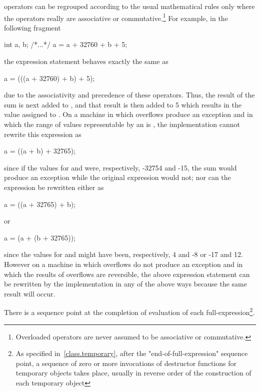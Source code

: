 \pnum
{}%
%
\enternote operators can be regrouped according to the usual
mathematical rules only where the operators really are associative or
commutative.\footnote{Overloaded operators are never assumed to be associative or
commutative. }
For example, in the following fragment
\begin{codeblock}
int a, b;
/*...*/
a = a + 32760 + b + 5;
\end{codeblock}
the expression statement behaves exactly the same as
\begin{codeblock}
a = (((a + 32760) + b) + 5);
\end{codeblock}
due to the associativity and precedence of these operators. Thus, the
result of the sum  is next added to , and
that result is then added to 5 which results in the value assigned to
. On a machine in which overflows produce an exception and in
which the range of values representable by an  is
, the implementation cannot rewrite this
expression as
\begin{codeblock}
a = ((a + b) + 32765);
\end{codeblock}
since if the values for  and  were, respectively,
-32754 and -15, the sum  would produce an exception while
the original expression would not; nor can the expression be rewritten
either as
\begin{codeblock}
a = ((a + 32765) + b);
\end{codeblock}
or
\begin{codeblock}
a = (a + (b + 32765));
\end{codeblock}
since the values for  and  might have been,
respectively, 4 and -8 or -17 and 12. However on a machine in which
overflows do not produce an exception and in which the results of
overflows are reversible, the above expression statement can be
rewritten by the implementation in any of the above ways because the
same result will occur. \exitnote

\pnum
There is a sequence point at the completion of evaluation of each
full-expression\footnote{As specified in~\ref{class.temporary}, after the
"end-of-full-expression" sequence point, a sequence of zero or more invocations
of destructor functions for temporary objects takes place, usually in
reverse order of the construction of each temporary object}.

